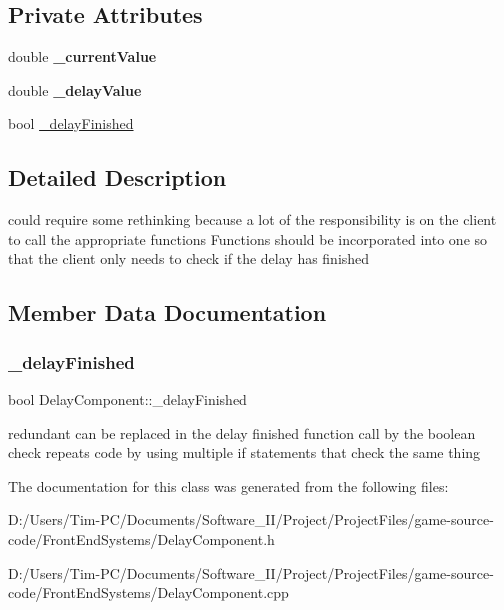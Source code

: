 \subsection*{Private Attributes}
\begin{DoxyCompactItemize}
\item 
\mbox{\label{class_delay_component_a33d6e279ece1ab6197688c5916dad96d}} 
double {\bfseries \+\_\+current\+Value}
\item 
\mbox{\label{class_delay_component_a36f26c01438d1c0347d06888d3b841ac}} 
double {\bfseries \+\_\+delay\+Value}
\item 
bool \hyperlink{class_delay_component_a821cd453973fced990ae204967e011ff}{\+\_\+delay\+Finished}
\end{DoxyCompactItemize}


\subsection{Detailed Description}
could require some rethinking because a lot of the responsibility is on the client to call the appropriate functions Functions should be incorporated into one so that the client only needs to check if the delay has finished 

\subsection{Member Data Documentation}
\mbox{\label{class_delay_component_a821cd453973fced990ae204967e011ff}} 
\subsubsection{\texorpdfstring{\+\_\+delay\+Finished}{\_delayFinished}}
{\footnotesize\ttfamily bool Delay\+Component\+::\+\_\+delay\+Finished\hspace{0.3cm}{\ttfamily [private]}}

redundant can be replaced in the delay finished function call by the boolean check repeats code by using multiple if statements that check the same thing 

The documentation for this class was generated from the following files\+:\begin{DoxyCompactItemize}
\item 
D\+:/\+Users/\+Tim-\/\+P\+C/\+Documents/\+Software\+\_\+\+I\+I/\+Project/\+Project\+Files/game-\/source-\/code/\+Front\+End\+Systems/Delay\+Component.\+h\item 
D\+:/\+Users/\+Tim-\/\+P\+C/\+Documents/\+Software\+\_\+\+I\+I/\+Project/\+Project\+Files/game-\/source-\/code/\+Front\+End\+Systems/Delay\+Component.\+cpp\end{DoxyCompactItemize}
